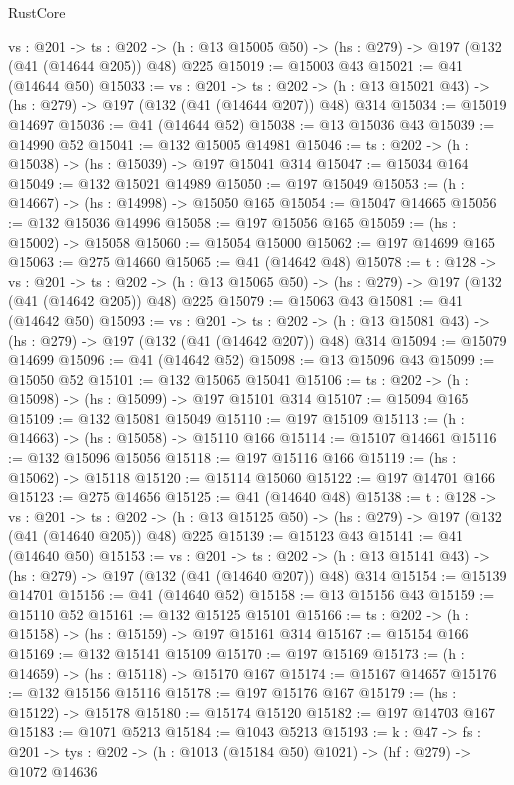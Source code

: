 \begin{lexlean}{RustCore}
\begin{coremodule}
  {vs : @201} ->
  {ts : @202} -> (h : @13 @15005 @50) -> (hs : @279) -> @197 (@132 (@41 (@14644 @205)) @48) @225
@15019 := @15003 @43
@15021 := @41 (@14644 @50)
@15033 := {vs : @201} ->
  {ts : @202} -> (h : @13 @15021 @43) -> (hs : @279) -> @197 (@132 (@41 (@14644 @207)) @48) @314
@15034 := @15019 @14697
@15036 := @41 (@14644 @52)
@15038 := @13 @15036 @43
@15039 := @14990 @52
@15041 := @132 @15005 @14981
@15046 := {ts : @202} -> (h : @15038) -> (hs : @15039) -> @197 @15041 @314
@15047 := @15034 @164
@15049 := @132 @15021 @14989
@15050 := @197 @15049
@15053 := (h : @14667) -> (hs : @14998) -> @15050 @165
@15054 := @15047 @14665
@15056 := @132 @15036 @14996
@15058 := @197 @15056 @165
@15059 := (hs : @15002) -> @15058
@15060 := @15054 @15000
@15062 := @197 @14699 @165
@15063 := @275 @14660
@15065 := @41 (@14642 @48)
@15078 := {t : @128} ->
  {vs : @201} ->
  {ts : @202} -> (h : @13 @15065 @50) -> (hs : @279) -> @197 (@132 (@41 (@14642 @205)) @48) @225
@15079 := @15063 @43
@15081 := @41 (@14642 @50)
@15093 := {vs : @201} ->
  {ts : @202} -> (h : @13 @15081 @43) -> (hs : @279) -> @197 (@132 (@41 (@14642 @207)) @48) @314
@15094 := @15079 @14699
@15096 := @41 (@14642 @52)
@15098 := @13 @15096 @43
@15099 := @15050 @52
@15101 := @132 @15065 @15041
@15106 := {ts : @202} -> (h : @15098) -> (hs : @15099) -> @197 @15101 @314
@15107 := @15094 @165
@15109 := @132 @15081 @15049
@15110 := @197 @15109
@15113 := (h : @14663) -> (hs : @15058) -> @15110 @166
@15114 := @15107 @14661
@15116 := @132 @15096 @15056
@15118 := @197 @15116 @166
@15119 := (hs : @15062) -> @15118
@15120 := @15114 @15060
@15122 := @197 @14701 @166
@15123 := @275 @14656
@15125 := @41 (@14640 @48)
@15138 := {t : @128} ->
  {vs : @201} ->
  {ts : @202} -> (h : @13 @15125 @50) -> (hs : @279) -> @197 (@132 (@41 (@14640 @205)) @48) @225
@15139 := @15123 @43
@15141 := @41 (@14640 @50)
@15153 := {vs : @201} ->
  {ts : @202} -> (h : @13 @15141 @43) -> (hs : @279) -> @197 (@132 (@41 (@14640 @207)) @48) @314
@15154 := @15139 @14701
@15156 := @41 (@14640 @52)
@15158 := @13 @15156 @43
@15159 := @15110 @52
@15161 := @132 @15125 @15101
@15166 := {ts : @202} -> (h : @15158) -> (hs : @15159) -> @197 @15161 @314
@15167 := @15154 @166
@15169 := @132 @15141 @15109
@15170 := @197 @15169
@15173 := (h : @14659) -> (hs : @15118) -> @15170 @167
@15174 := @15167 @14657
@15176 := @132 @15156 @15116
@15178 := @197 @15176 @167
@15179 := (hs : @15122) -> @15178
@15180 := @15174 @15120
@15182 := @197 @14703 @167
@15183 := @1071 @5213
@15184 := @1043 @5213
@15193 := {k : @47} ->
  {fs : @201} -> {tys : @202} -> (h : @1013 (@15184 @50) @1021) -> (hf : @279) -> @1072 @14636

\end{coremodule}
\end{lexlean}
